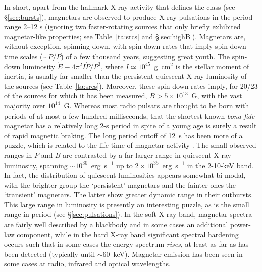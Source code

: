 In short, apart from the hallmark X-ray activity that defines the class (see \S\ref{sec:bursts}),
magnetars are observed to produce X-ray pulsations in the period range 2--12 s (ignoring two
faster-rotating sources that only briefly exhibited magnetar-like properties; 
see Table~\ref{ta:srcs} and \S\ref{sec:highB}).  Magnetars
are, without exception, spinning down, with spin-down rates that imply spin-down time scales ($\sim P/\dot{P}$)
of a few thousand years, suggesting great youth.  The spin-down luminosity $\dot{E} \equiv 4 \pi^2 I \dot{P}/P^3$, where
$I \simeq 10^{45}$~g~cm$^2$ is the stellar moment of inertia, is usually far smaller than the persistent quiescent
X-ray luminosity of the sources (see Table~\ref{ta:srcs}).
Moreover, these spin-down rates imply, for 20/23 of the sources
for which it has been measured, $B>5\times 10^{13}$~G, with the vast majority over $10^{14}$~G.  
Whereas most radio pulsars are thought to be born with periods
of at most a few hundred milliseconds, that the shortest known {\it bona fide} magnetar
has a relatively long 2-s period in spite of a young age
is surely a result of rapid magnetic braking. 
The long period cutoff of 12~s has been more of a puzzle, which is related to the life-time
of magnetar activity \citep[e.g.][]{cgp00,vrp+13}.
The small observed
ranges in $P$ and $B$ are contrasted by a far larger range in quiescent X-ray luminosity, spanning 
$\sim 10^{30}$~erg~s$^{-1}$ up to $2 \times 10^{35}$~erg~s$^{-1}$ in the 2-10-keV band.  
In fact, the distribution of quiescent luminosities appears somewhat bi-modal, with the
brighter group the `persistent' magnetars and the fainter ones the `transient' magnetars.  The latter 
show greater dynamic range in their outbursts.
This large range in luminosity is presently an interesting puzzle, as is
the small range in period (see \S\ref{sec:pulsations}).
In the soft X-ray band, magnetar spectra are fairly well described by a blackbody and in some
cases an additional power-law component, while in the hard X-ray band significant spectral hardening occurs such that
in some cases the energy spectrum {\it rises}, at least as far as has been detected (typically until $\sim$60~keV).   
Magnetar emission has been seen in some cases at radio, infrared and optical wavelengths.


